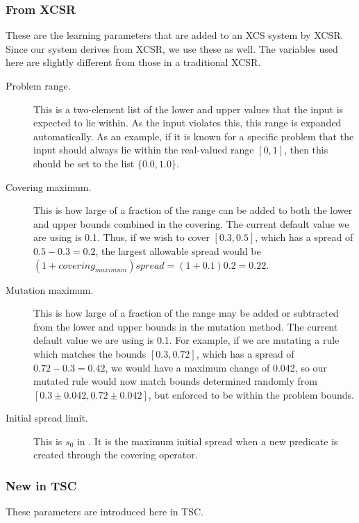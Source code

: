 \subsubsection{From XCSR}
These are the learning parameters that are added to an XCS system by XCSR.
Since our system derives from XCSR, we use these as well.
The variables used here are slightly different from those in a traditional XCSR.

\begin{description}
\item [Problem range.]
This is a two-element list of the lower and upper values that the input is expected to lie within.
As the input violates this, this range is expanded automatically.
As an example, if it is known for a specific problem that the input should always lie within the real-valued range $[0,1]$, then this should be set to the list $\{0.0,1.0\}$.
\item [Covering maximum.]
This is how large of a fraction of the range can be added to both the lower and upper bounds combined in the covering.
The current default value we are using is 0.1.
Thus, if we wish to cover $[0.3,0.5]$,  which has a spread of $0.5-0.3=0.2$, the largest allowable spread would be
$(1 + covering_{maximum}) spread = (1+0.1) 0.2 = 0.22$.
\item [Mutation maximum.]
This is how large of a fraction of the range may be added or subtracted from the lower and upper bounds in the mutation method.
The current default value we are using is 0.1.
For example, if we are mutating a rule which matches the bounds $[0.3,0.72]$, which has a spread of $0.72-0.3=0.42$, we would have a maximum change of 0.042, so our mutated rule would now match bounds determined randomly from $[0.3 \pm 0.042, 0.72 \pm 0.042]$, but enforced to be within the problem bounds.
\item [Initial spread limit.]
This is $s_0$ in \cite{WilsonXCSR}.
It is the maximum initial spread when a new predicate is created through the covering operator.
\end{description}

\subsubsection{New in TSC}
These parameters are introduced here in TSC.

